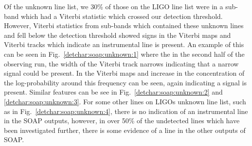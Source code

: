 Of the unknown line list, we 30\% of those on the \gls{LIGO} line list were in a sub-band which had a Viterbi statistic which crossed our detection threshold.  However, Viterbi statistics from sub-bands which contained these unknown lines and fell below the detection threshold showed signs in the Viterbi maps and Viterbi tracks which indicate an instrumental line is present. An example of this can be seen in Fig.~\ref{detchar:soap:unknown:1} where the in the second half of the observing run, the width of the Viterbi track narrows indicating that a narrow signal could be present. In the Viterbi maps and increase in the concentration of the log-probability around this frequency can be seen, again indicating a signal is present. Similar features can be see in Fig.~\ref{detchar:soap:unknown:2} and \ref{detchar:soap:unknown:3}.
For some other lines on \glspl{LIGO} unknown line list, such as in Fig.~\ref{detchar:soap:unknown:4}, there is no indication of an instrumental line in the SOAP outputs, however, in over 50\% of the undetected lines which have been investigated further, there is some evidence of a line in the other outputs of SOAP.
%
